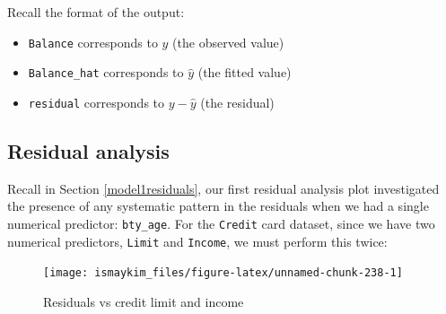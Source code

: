 \documentclass[12pt,]{krantz}
\makeatletter
\newenvironment{Shaded}{\begin{snugshade}}{\end{snugshade}}
\newcommand{\KeywordTok}[1]{\textcolor[rgb]{0.27,0.27,0.27}{\textbf{#1}}}
\newcommand{\DataTypeTok}[1]{\textcolor[rgb]{0.27,0.27,0.27}{#1}}
\newcommand{\StringTok}[1]{\textcolor[rgb]{0.5,0.5,0.5}{#1}}
\newcommand{\OperatorTok}[1]{\textcolor[rgb]{0.43,0.43,0.43}{\textbf{#1}}}
\newcommand{\NormalTok}[1]{#1}
\providecommand{\tightlist}{%
  \setlength{\itemsep}{0pt}\setlength{\parskip}{0pt}}
\newenvironment{kframe}{%
\medskip{}
\setlength{\fboxsep}{.8em}
 \def\at@end@of@kframe{}%
 \ifinner\ifhmode%
  \def\at@end@of@kframe{\end{minipage}}%
  \begin{minipage}{\columnwidth}%
 \fi\fi%
 \def\FrameCommand##1{\hskip\@totalleftmargin \hskip-\fboxsep
 \colorbox{shadecolor}{##1}\hskip-\fboxsep
     \hskip-\linewidth \hskip-\@totalleftmargin \hskip\columnwidth}%
 \MakeFramed {\advance\hsize-\width
   \@totalleftmargin\z@ \linewidth\hsize
   \@setminipage}}%
 {\par\unskip\endMakeFramed%
 \at@end@of@kframe}
\renewenvironment{Shaded}{\begin{kframe}}{\end{kframe}}
\theoremstyle{definition}
\theoremstyle{definition}
\theoremstyle{definition}
\theoremstyle{remark}
\makeatother
\begin{document}
Recall the format of the output:

\begin{itemize}
\tightlist
\item
  \texttt{Balance} corresponds to \(y\) (the observed value)
\item
  \texttt{Balance\_hat} corresponds to \(\widehat{y}\) (the fitted
  value)
\item
  \texttt{residual} corresponds to \(y - \widehat{y}\) (the residual)
\end{itemize}

\subsection{Residual analysis}\label{model3residuals}

Recall in Section \ref{model1residuals}, our first residual analysis
plot investigated the presence of any systematic pattern in the
residuals when we had a single numerical predictor: \texttt{bty\_age}.
For the \texttt{Credit} card dataset, since we have two numerical
predictors, \texttt{Limit} and \texttt{Income}, we must perform this
twice:

\begin{Shaded}
\end{Shaded}

\begin{figure}

{\centering \texttt{[image: ismaykim\_files/figure-latex/unnamed-chunk-238-1]} 

}

\caption{Residuals vs credit limit and income}\label{fig:unnamed-chunk-238}
\end{figure}
\end{document}

